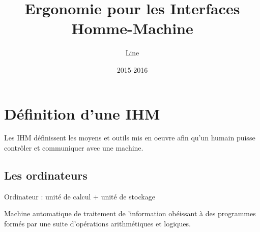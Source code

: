 \documentclass{article}
\title{\textbf{Ergonomie pour les Interfaces Homme-Machine}}
\author{Line \bsc{POUVARET}}
\date{2015-2016}
\begin{document}
\maketitle

\section{Définition d'une IHM}
Les IHM définissent les moyens et outils mis en oeuvre afin qu'un humain puisse contrôler et communiquer avec une machine.\\

\subsection{Les ordinateurs}
Ordinateur : unité de calcul + unité de stockage

Machine automatique de traitement de 'information obéissant à des programmes formés par une suite d'opérations arithmétiques et logiques.
\end{document}
